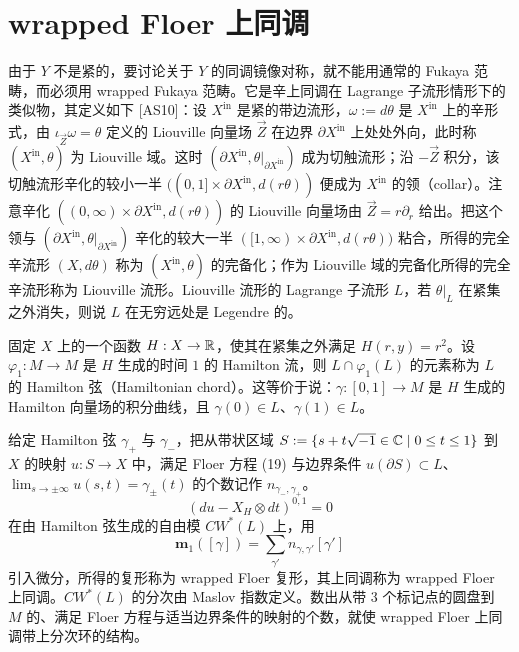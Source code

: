 \section{wrapped Floer 上同调}

由于 $Y$ 不是紧的，要讨论关于 $Y$ 的同调镜像对称，就不能用通常的 Fukaya 范畴，而必须用 wrapped Fukaya 范畴。它是辛上同调在 Lagrange 子流形情形下的类似物，其定义如下 [AS10]：设 $X^{\mathrm{in}}$ 是紧的带边流形，$\omega:=d\theta$ 是 $X^{\mathrm{in}}$ 上的辛形式，由 $\iota_{\vec Z}\omega=\theta$ 定义的 Liouville 向量场 $\vec Z$ 在边界 $\partial X^{\mathrm{in}}$ 上处处外向，此时称 $(X^{\mathrm{in}},\theta)$ 为 Liouville 域。这时 $(\partial X^{\mathrm{in}},\theta|_{\partial X^{\mathrm{in}}})$ 成为切触流形；沿 $-\vec Z$ 积分，该切触流形辛化的较小一半 $((0,1]\times\partial X^{\mathrm{in}},d(r\theta))$ 便成为 $X^{\mathrm{in}}$ 的领（collar）。注意辛化 $((0,\infty)\times\partial X^{\mathrm{in}},d(r\theta))$ 的 Liouville 向量场由 $\vec Z=r\partial_r$ 给出。把这个领与 $(\partial X^{\mathrm{in}},\theta|_{\partial X^{\mathrm{in}}})$ 辛化的较大一半 $([1,\infty)\times\partial X^{\mathrm{in}},d(r\theta))$ 粘合，所得的完全辛流形 $(X,d\theta)$ 称为 $(X^{\mathrm{in}},\theta)$ 的完备化；作为 Liouville 域的完备化所得的完全辛流形称为 Liouville 流形。Liouville 流形的 Lagrange 子流形 $L$，若 $\theta|_L$ 在紧集之外消失，则说 $L$ 在无穷远处是 Legendre 的。

固定 $X$ 上的一个函数 $H:X\to\mathbb{R}$，使其在紧集之外满足 $H(r,y)=r^2$。设 $\varphi_1:M\to M$ 是 $H$ 生成的时间 $1$ 的 Hamilton 流，则 $L\cap\varphi_1(L)$ 的元素称为 $L$ 的 Hamilton 弦（Hamiltonian chord）。这等价于说：$\gamma:[0,1]\to M$ 是 $H$ 生成的 Hamilton 向量场的积分曲线，且 $\gamma(0)\in L$、$\gamma(1)\in L$。

给定 Hamilton 弦 $\gamma_+$ 与 $\gamma_-$，把从带状区域 $S:=\{s+t\sqrt{-1}\in\mathbb{C}\mid 0\le t\le 1\}$ 到 $X$ 的映射 $u:S\to X$ 中，满足 Floer 方程 (19) 与边界条件 $u(\partial S)\subset L$、$\lim_{s\to\pm\infty}u(s,t)=\gamma_\pm(t)$ 的个数记作 $n_{\gamma_-,\gamma_+}$。
\begin{equation}
\left(du-X_H\otimes dt\right)^{0,1}=0
\tag{19}
\end{equation}
\noindent 在由 Hamilton 弦生成的自由模 $CW^*(L)$ 上，用
\begin{equation}
\mathbf{m}_1([\gamma])=\sum_{\gamma'}n_{\gamma,\gamma'}[\gamma']
\tag{20}
\end{equation}
\noindent 引入微分，所得的复形称为 wrapped Floer 复形，其上同调称为 wrapped Floer 上同调。$CW^*(L)$ 的分次由 Maslov 指数定义。数出从带 $3$ 个标记点的圆盘到 $M$ 的、满足 Floer 方程与适当边界条件的映射的个数，就使 wrapped Floer 上同调带上分次环的结构。

